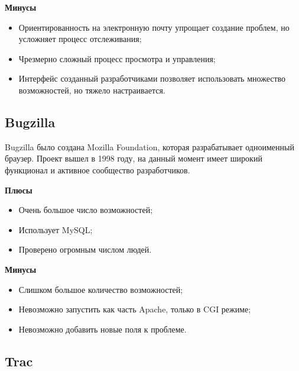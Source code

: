 
\textbf{Минусы}

\begin{itemize}

\item Ориентированность на электронную почту упрощает создание проблем, но усложняет процесс отслеживания;

\item Чрезмерно сложный процесс просмотра и управления;

\item Интерфейс созданный разработчиками позволяет использовать множество возможностей, но тяжело настраивается.

\end{itemize}


\subsection{ Bugzilla } \label{sect2_16_4}

Bugzilla было создана Mozilla Foundation, которая разрабатывает одноименный браузер. Проект вышел в 1998 году, на данный момент имеет широкий функционал и активное сообщество разработчиков.

\textbf{Плюсы}

\begin{itemize}

\item Очень большое число возможностей;

\item Использует MySQL;

\item Проверено огромным числом людей.

\end{itemize}


\textbf{Минусы}

\begin{itemize}

\item Слишком большое количество возможностей;

\item Невозможно запустить как часть Apache, только в CGI режиме;

\item Невозможно добавить новые поля к проблеме.

\end{itemize}

\subsection{ Trac } \label{sect2_16_5}

